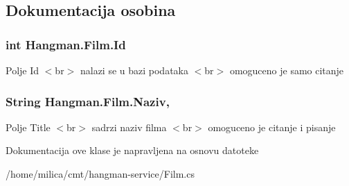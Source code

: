 \subsection{Dokumentacija osobina}
\hypertarget{classHangman_1_1Film_aa49d39b4b0c7e6d5cd01e4e2b1990c3d}{}
\subsubsection[{Id}]{\setlength{\rightskip}{0pt plus 5cm}int Hangman.\+Film.\+Id\hspace{0.3cm}{\ttfamily [get]}}\label{classHangman_1_1Film_aa49d39b4b0c7e6d5cd01e4e2b1990c3d}
Polje Id $<$br$>$ nalazi se u bazi podataka $<$br$>$ omoguceno je samo citanje \hypertarget{classHangman_1_1Film_a0b5bec2ea0b6d1194da990d0705a4664}{}
\subsubsection[{Naziv}]{\setlength{\rightskip}{0pt plus 5cm}String Hangman.\+Film.\+Naziv\hspace{0.3cm}{\ttfamily [get]}, {\ttfamily [set]}}\label{classHangman_1_1Film_a0b5bec2ea0b6d1194da990d0705a4664}
Polje Title $<$br$>$ sadrzi naziv filma $<$br$>$ omoguceno je citanje i pisanje 

Dokumentacija ove klase je napravljena na osnovu datoteke \begin{DoxyCompactItemize}
\item 
/home/milica/cmt/hangman-\/service/Film.\+cs\end{DoxyCompactItemize}
